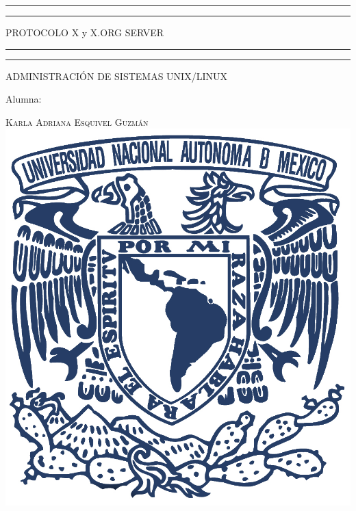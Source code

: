 \documentclass[a4paper, 11pt, oneside]{article}
\begin{document}
 

\begin{titlepage} 

	\centering 
	
	\scshape 
	
	\vspace*{\baselineskip} 
	
	
	
	\rule{\textwidth}{1.6pt}\vspace*{-\baselineskip}\vspace*{2pt} 
	\rule{\textwidth}{0.4pt} 
	
	\vspace{0.75\baselineskip} 
	
	{\LARGE PROTOCOLO X y X.ORG SERVER}	
	\vspace{0.75\baselineskip} 
	
	\rule{\textwidth}{0.4pt}\vspace*{-\baselineskip}\vspace{3.2pt}
	\rule{\textwidth}{1.6pt} 
	
	\vspace{2\baselineskip} 
	

	ADMINISTRACIÓN DE SISTEMAS UNIX/LINUX
	
	\vspace*{3\baselineskip} 
	
	
	
	Alumna:
	
	\vspace{0.5\baselineskip} 
	
	{\scshape\Large Karla Adriana Esquivel Guzmán \\} 
	\vspace{0.5\baselineskip} 
	\vfill
	\includegraphics{unam.jpg}
	

\end{titlepage}
\end{document}
